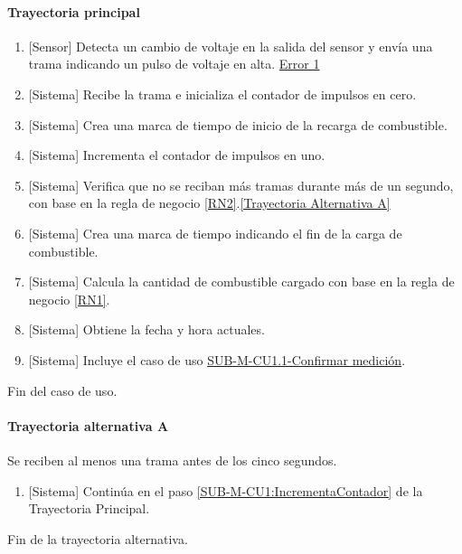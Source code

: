 \paragraph{Trayectoria principal}
	\begin{enumerate}
		\item {[Sensor]} Detecta un cambio de voltaje en la salida del sensor y envía una trama indicando un pulso de voltaje en alta. \hyperref[SUB-M-CU1:Error1]{Error 1}
		\item {[Sistema]} Recibe la trama e inicializa el contador de impulsos en cero.
		\item \label{SUB-M-CU1:MarcaInicio} {[Sistema]} Crea una marca de tiempo de inicio de la recarga de combustible.
		\item \label{SUB-M-CU1:IncrementaContador} {[Sistema]} Incrementa el contador de impulsos en uno.
		\item {[Sistema]} Verifica que no se reciban más tramas durante más de un segundo, con base en la regla de negocio \ref{RN2}.\hyperref[SUB-M-CU1:TA]{[Trayectoria Alternativa A]}
		\item {[Sistema]} Crea una marca de tiempo indicando el fin de la carga de combustible.
		\item {[Sistema]} Calcula la cantidad de combustible cargado con base en la regla de negocio \ref{RN1}.
		\item {[Sistema]} Obtiene la fecha y hora actuales.
		\item {[Sistema]} Incluye el caso de uso \hyperref[SUB-M-CU1.1]{SUB-M-CU1.1-Confirmar medición}.
	\end{enumerate}
	Fin del caso de uso.

\paragraph{Trayectoria alternativa A} \label{SUB-M-CU1:TA}
	Se reciben al menos una trama antes de los cinco segundos.
	\begin{enumerate}[label=A\arabic*.]
		\item {[Sistema]} Continúa en el paso \ref{SUB-M-CU1:IncrementaContador} de la Trayectoria Principal.
	\end{enumerate}
	Fin de la trayectoria alternativa.
